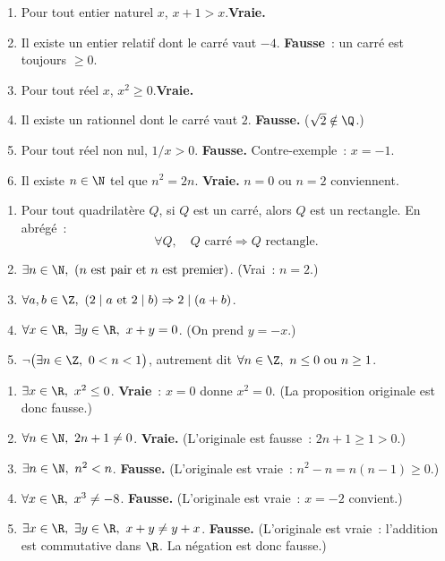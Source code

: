 \begin{enumerate}
  \item \og Pour tout entier naturel $x$, $x+1>x$.\fg\enspace \textbf{Vraie.}
  \item \og Il existe un entier relatif dont le carr\'e vaut $-4$.\fg\enspace
        \textbf{Fausse}~: un carr\'e est toujours $\geq0$.
  \item \og Pour tout r\'eel $x$, $x^2\geq0$.\fg\enspace \textbf{Vraie.}
  \item \og Il existe un rationnel dont le carr\'e vaut $2$.\fg\enspace
        \textbf{Fausse.} ($\sqrt{2}\notin\Q$.)
  \item \og Pour tout r\'eel non nul, $1/x>0$.\fg\enspace
        \textbf{Fausse.} Contre-exemple~: $x=-1$.
  \item \og Il existe $n\in\N$ tel que $n^2=2n$.\fg\enspace
        \textbf{Vraie.} $n=0$ ou $n=2$ conviennent.
\end{enumerate}


\begin{enumerate}
  \item Pour tout quadrilat\`ere $Q$, si $Q$ est un carr\'e, alors $Q$ est un rectangle.
        En abr\'eg\'e~:
        \[\forall Q,\quad Q\text{ carr\'e}\Rightarrow Q\text{ rectangle}.\]
  \item $\exists n\in\N,\ (n \text{ est pair et } n \text{ est premier})$.
        (Vrai~: $n=2$.)
  \item $\forall a,b\in\Z,\ (2\mid a\ \text{et}\ 2\mid b)\Rightarrow 2\mid(a+b)$.
  \item $\forall x\in\R,\ \exists y\in\R,\ x+y=0$. (On prend $y=-x$.)
  \item $\lnot\bigl(\exists n\in\Z,\ 0<n<1\bigr)$, autrement dit
        $\forall n\in\Z,\ n\leq0\ \text{ou}\ n\geq1$.
\end{enumerate}


\begin{enumerate}
  \item $\exists x\in\R,\ x^2\leq0$. \textbf{Vraie}~: $x=0$ donne $x^2=0$.
        (La proposition originale est donc fausse.)
  \item $\forall n\in\N,\ 2n+1\ne0$. \textbf{Vraie.}
        (L'originale est fausse~: $2n+1\geq1>0$.)
  \item $\exists n\in\N,\ n^2<n$. \textbf{Fausse.}
        (L'originale est vraie~: $n^2-n=n(n-1)\geq0$.)
  \item $\forall x\in\R,\ x^3\ne-8$. \textbf{Fausse.}
        (L'originale est vraie~: $x=-2$ convient.)
  \item $\exists x\in\R,\ \exists y\in\R,\ x+y\ne y+x$. \textbf{Fausse.}
        (L'originale est vraie~: l'addition est commutative dans $\R$.
        La n\'egation est donc fausse.)
\end{enumerate}

